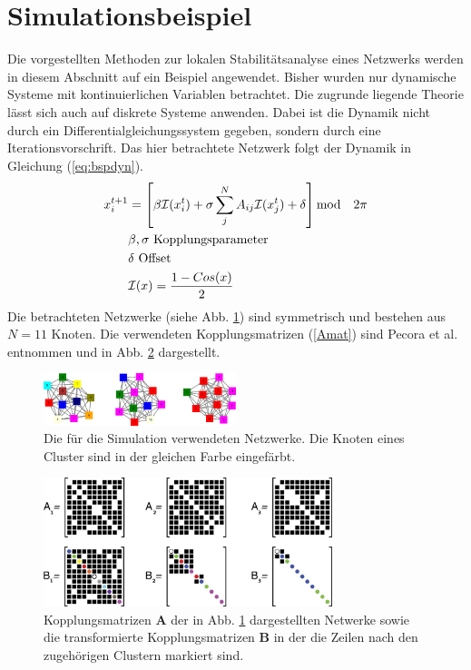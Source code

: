 \section{Simulationsbeispiel}
Die vorgestellten Methoden zur lokalen Stabilitätsanalyse eines Netzwerks werden in diesem Abschnitt auf ein Beispiel angewendet. Bisher wurden nur dynamische Systeme mit kontinuierlichen Variablen betrachtet. Die zugrunde liegende Theorie lässt sich auch auf diskrete Systeme anwenden. Dabei ist die Dynamik nicht durch ein Differentialgleichungssystem gegeben, sondern durch eine Iterationsvorschrift. Das hier betrachtete Netzwerk \cite{pecora2014} folgt der Dynamik in Gleichung (\ref{eq:bspdyn}).
\begin{align}
\label{eq:bspdyn}
	x_i^{t+1}&=\left[\beta\mathcal{I}(x_i^t)+\sigma \sum_j^N A_{ij}\mathcal{I}(x_j^t)+\delta\right] \text{mod}\quad 2\pi
	\\\notag & \beta,\sigma \text{ Kopplungsparameter}
	\\\notag  & \delta \text{ Offset}
	\\\notag &\mathcal{I}(x)=\frac{1-Cos(x)}{2}
\end{align}
Die betrachteten Netzwerke (siehe Abb. \ref{fig:cluster}) sind symmetrisch und bestehen aus $N=11$ Knoten. Die verwendeten Kopplungsmatrizen (\ref{Amat}) sind Pecora et al. \cite{pecora2014} entnommen und in Abb. \ref{fig:abmat} dargestellt. 
\begin{figure}
	 \centering
	 \includegraphics[width=0.5\textwidth]{abb/misc/cluster.png}
	 \caption{Die für die Simulation verwendeten Netzwerke. Die Knoten eines Cluster sind in der gleichen Farbe eingefärbt.}
	 \label{fig:cluster}
\end{figure}

\begin{figure}
	\centering
	\includegraphics[width=0.75\textwidth]{abb/misc/ABMat.png}
	\caption{Kopplungsmatrizen $\boldsymbol{A}$ der in Abb. \ref{fig:cluster} dargestellten Netwerke sowie die transformierte Kopplungsmatrizen $\boldsymbol{B}$ in der die Zeilen nach den zugehörigen Clustern markiert sind\cite{pecora2014}.}
\label{fig:abmat}
\end{figure}

